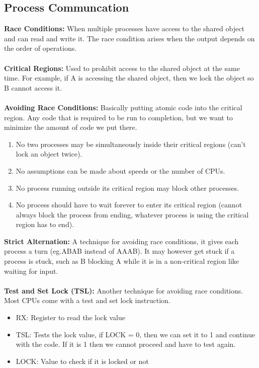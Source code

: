\documentclass[a4paper,10pt]{article}
\begin{document}
\subsection{Process Communcation}
\textcolor{CarnationPink}{\textbf{Race Conditions:}} When multiple processes have access to the shared object and can read and write it. The race condition arises when the output depends on the order of operations. \\\\
\textcolor{CarnationPink}{\textbf{Critical Regions:}} Used to prohibit access to the shared object at the same time. For example, if A is accessing the shared object, then we lock the object so B cannot access it. \\\\
\textcolor{CarnationPink}{\textbf{Avoiding Race Conditions:}} Basically putting atomic code into the critical region. Any code that is required to be run to completion, but we want to minimize the amount of code we put there. 
\begin{enumerate}
\item No two processes may be simultaneously inside their critical regions (can't lock an object twice).
\item No assumptions can be made about speeds or the number of CPUs. 
\item No process running outside its critical region may block other processes. 
\item No process should have to wait forever to enter its critical region (cannot always block the process from ending, whatever process is using the critical region has to end). 
\end{enumerate}
\textcolor{CarnationPink}{\textbf{Strict Alternation:}} A technique for avoiding race conditions, it gives each process a turn (eg.ABAB instead of AAAB). It may however get stuck if a process is stuck, such as B blocking A while it is in a non-critical region like waiting for input. \\\\
\textcolor{CarnationPink}{\textbf{Test and Set Lock (TSL):}} Another technique for avoiding race conditions. Most CPUs come with a test and set lock instruction. 
\begin{itemize}
\item \textcolor{CarnationPink}{RX:} Register to read the lock value
\item \textcolor{CarnationPink}{TSL:} Tests the lock value, if LOCK = 0, then we can set it to 1 and continue with the code. If it is 1 then we cannot proceed and have to test again. 
\item \textcolor{CarnationPink}{LOCK:} Value to check if it is locked or not
\end{itemize}
\end{document}
